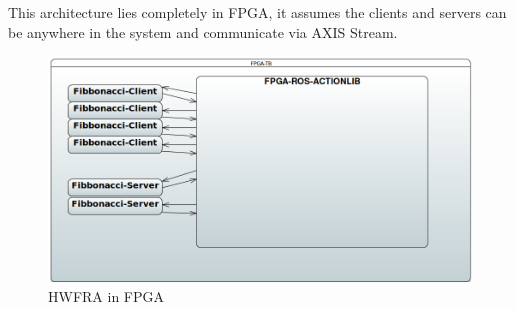 This architecture lies completely in FPGA, it assumes the clients and servers can be anywhere in the system and communicate via AXIS Stream.


\begin{figure}[htb]
	\centering
	\includegraphics[width=.8\linewidth]{figures/fpga-tb.png}
	\caption{HWFRA in FPGA}
	\label{fig:hwfra-tb}
\end{figure}